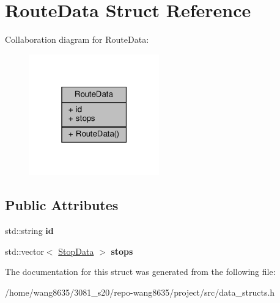 \hypertarget{structRouteData}{}\section{Route\+Data Struct Reference}
\label{structRouteData}


Collaboration diagram for Route\+Data\+:
\nopagebreak
\begin{figure}[H]
\begin{center}
\leavevmode
\includegraphics[width=159pt]{structRouteData__coll__graph}
\end{center}
\end{figure}
\subsection*{Public Attributes}
\begin{DoxyCompactItemize}
\item 
\mbox{\label{structRouteData_a578af871a15d4737ab8d2074887da85f}} 
std\+::string {\bfseries id}
\item 
\mbox{\label{structRouteData_af867789789fbcfe97bdd554e56b121bf}} 
std\+::vector$<$ \hyperlink{structStopData}{Stop\+Data} $>$ {\bfseries stops}
\end{DoxyCompactItemize}


The documentation for this struct was generated from the following file\+:\begin{DoxyCompactItemize}
\item 
/home/wang8635/3081\+\_\+s20/repo-\/wang8635/project/src/data\+\_\+structs.\+h\end{DoxyCompactItemize}
